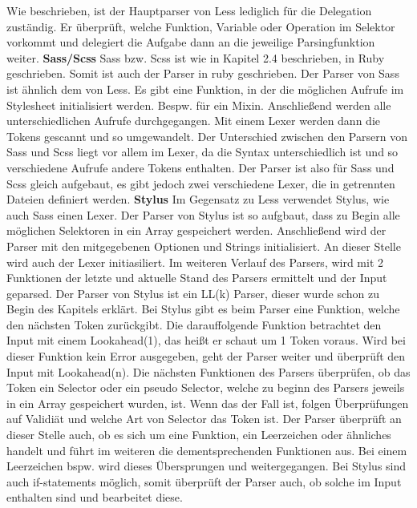 Wie beschrieben, ist der Hauptparser von Less lediglich für die Delegation zuständig. Er überprüft, welche Funktion, Variable oder Operation im Selektor vorkommt und delegiert die Aufgabe dann an die jeweilige Parsingfunktion weiter.
\newline\newline
\textbf{Sass/Scss}\newline
Sass bzw. Scss ist wie in Kapitel 2.4 beschrieben, in Ruby geschrieben. Somit ist auch der Parser in ruby geschrieben.\newline
Der Parser von Sass ist ähnlich dem von Less. Es gibt eine Funktion, in der die möglichen Aufrufe im Stylesheet initialisiert werden. Bespw. für ein Mixin. Anschließend werden alle unterschiedlichen Aufrufe durchgegangen. Mit einem Lexer werden dann die Tokens gescannt und so umgewandelt.
Der Unterschied zwischen den Parsern von Sass und Scss liegt vor allem im Lexer, da die Syntax unterschiedlich ist und so verschiedene Aufrufe andere Tokens enthalten. \newline
Der Parser ist also für Sass und Scss gleich aufgebaut, es gibt jedoch zwei verschiedene Lexer, die in getrennten Dateien definiert werden.
\newline\newline
\textbf{Stylus}\newline
Im Gegensatz zu Less verwendet Stylus, wie auch Sass einen Lexer. Der Parser von Stylus ist so aufgbaut, dass zu Begin alle möglichen Selektoren in ein Array gespeichert werden. Anschließend wird der Parser mit den mitgegebenen Optionen und Strings initialisiert. An dieser Stelle wird auch der Lexer initiasiliert.\newline
Im weiteren Verlauf des Parsers, wird mit 2 Funktionen der letzte und aktuelle Stand des Parsers ermittelt und der Input geparsed.\newline
Der Parser von Stylus ist ein LL(k) Parser, dieser wurde schon zu Begin des Kapitels erklärt. Bei Stylus gibt es beim Parser eine Funktion, welche den nächsten Token zurückgibt. Die darauffolgende Funktion betrachtet den Input mit einem Lookahead(1), das heißt er schaut um 1 Token voraus. Wird bei dieser Funktion kein Error ausgegeben, geht der Parser weiter und überprüft den Input mit Lookahead(n). \newline
Die nächsten Funktionen des Parsers überprüfen, ob das Token ein Selector oder ein pseudo Selector, welche zu beginn des Parsers jeweils in ein Array gespeichert wurden, ist. Wenn das der Fall ist, folgen Überprüfungen auf Validiät und welche Art von Selector das Token ist. Der Parser überprüft an dieser Stelle auch, ob es sich um eine Funktion, ein Leerzeichen oder ähnliches handelt und führt im weiteren die dementsprechenden Funktionen aus. Bei einem Leerzeichen bspw. wird dieses Übersprungen und weitergegangen.\newline
Bei Stylus sind auch if-statements möglich, somit überprüft der Parser auch, ob solche im Input enthalten sind und bearbeitet diese.
\newpage



